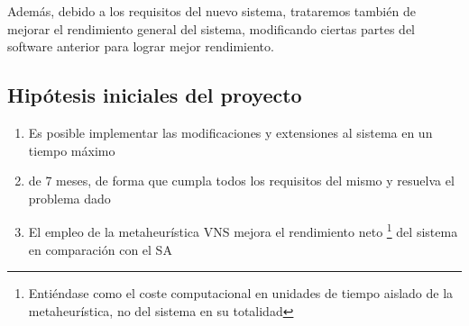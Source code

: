 Además, debido a los requisitos del nuevo sistema, trataremos también de mejorar el rendimiento general del sistema,
modificando ciertas partes del software anterior para lograr mejor rendimiento.

\subsection{Hipótesis iniciales del proyecto}
\label{sec:Hipotesis}
\begin{enumerate}[label={H\arabic*}]
    \item[\namedlabel{H1}]  Es posible implementar las modificaciones y extensiones al sistema en un tiempo máximo
    \item de 7 meses, de forma que cumpla todos los requisitos del mismo y resuelva el problema dado %
    \item[\namedlabel{H2}]  El empleo de la metaheurística VNS mejora el rendimiento neto
    \footnote{Entiéndase como el coste computacional en unidades de tiempo aislado de la metaheurística, no del sistema en su totalidad}
    del sistema en comparación con el SA
\end{enumerate}




